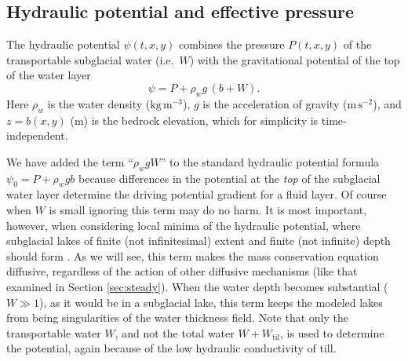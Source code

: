\documentclass[gmd]{copernicus}   %
\newcommand{\text}{\textrm}
\newcommand{\Wtil}{W_{\text{til}}}
\begin{document}
\subsection{Hydraulic potential and effective pressure}  The  hydraulic potential $\psi(t,x,y)$ combines the pressure $P(t,x,y)$ of the transportable subglacial water (i.e.~$W$) with the gravitational potential of the top of the water layer \citep{Goelleretal2013,Hewittetal2012}
\begin{equation} \label{eq:potential}
\psi = P + \rho_w g\, (b+W).
\end{equation}
Here $\rho_w$ is the water density ($\text{kg}\,\text{m}^{-3}$), $g$ is the acceleration of gravity ($\text{m}\,\text{s}^{-2}$), and $z=b(x,y)$ ($\text{m}$) is the bedrock elevation, which for simplicity is time-independent.

We have added the term ``$\rho_w g W$'' to the standard hydraulic potential formula $\psi_0 = P + \rho_w g b$ \citep{Clarke05,Shreve1972} because differences in the potential at the \emph{top} of the subglacial water layer determine the driving potential gradient for a fluid layer.  Of course when $W$ is small ignoring this term may do no harm.  It is most important, however, when considering local minima of the hydraulic potential, where subglacial lakes of finite (not infinitesimal) extent and finite (not infinite) depth should form \citep[compare][]{Siegertetal2009}.  As we will see, this term makes the mass conservation equation diffusive, regardless of the action of other diffusive mechanisms (like that examined in Section \ref{sec:steady}).  When the water depth becomes substantial ($W\gg 1$), as it would be in a subglacial lake, this term keeps the modeled lakes from being singularities of the water thickness field.  Note that only the transportable water $W$, and not the total water $W+\Wtil$, is used to determine the potential, again because of the low hydraulic conductivity of till.
\end{document}
